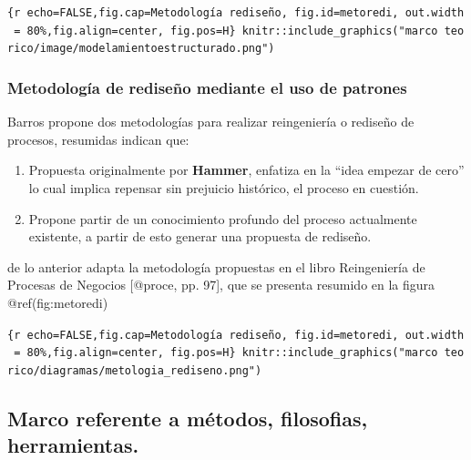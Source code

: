 \documentclass[11pt]{article}
\begin{document}
\texttt{\{r\ echo=FALSE,fig.cap=\textquotesingle{}Metodología\ rediseño\textquotesingle{},\ fig.id=\textquotesingle{}metoredi\textquotesingle{},\ out.width\ =\ \textquotesingle{}80\%\textquotesingle{},fig.align=\textquotesingle{}center\textquotesingle{},\ fig.pos=\textquotesingle{}H\textquotesingle{}\}\ knitr::include\_graphics("marco\ teorico/image/modelamientoestructurado.png")}

\hypertarget{metodologuxeda-de-rediseuxf1o-mediante-el-uso-de-patrones}{%
\subsubsection{Metodología de rediseño mediante el uso de
patrones}\label{metodologuxeda-de-rediseuxf1o-mediante-el-uso-de-patrones}}

Barros propone dos metodologías para realizar reingeniería o rediseño de
procesos, resumidas indican que:

\begin{enumerate}
\def\labelenumi{\arabic{enumi}.}
\item
  Propuesta originalmente por \textbf{Hammer}, enfatiza en la ``idea
  empezar de cero'' lo cual implica repensar sin prejuicio histórico, el
  proceso en cuestión.
\item
  Propone partir de un conocimiento profundo del proceso actualmente
  existente, a partir de esto generar una propuesta de rediseño.
\end{enumerate}

de lo anterior adapta la metodología propuestas en el libro Reingeniería
de Procesas de Negocios {[}@proce, pp. 97{]}, que se presenta resumido
en la figura @ref(fig:metoredi)

\texttt{\{r\ echo=FALSE,fig.cap=\textquotesingle{}Metodología\ rediseño\textquotesingle{},\ fig.id=\textquotesingle{}metoredi\textquotesingle{},\ out.width\ =\ \textquotesingle{}80\%\textquotesingle{},fig.align=\textquotesingle{}center\textquotesingle{},\ fig.pos=\textquotesingle{}H\textquotesingle{}\}\ knitr::include\_graphics("marco\ teorico/diagramas/metologia\_rediseno.png")}

\hypertarget{marco-referente-a-muxe9todos-filosofias-herramientas.}{%
\subsection{Marco referente a métodos, filosofias,
herramientas.}\label{marco-referente-a-muxe9todos-filosofias-herramientas.}}
\end{document}
